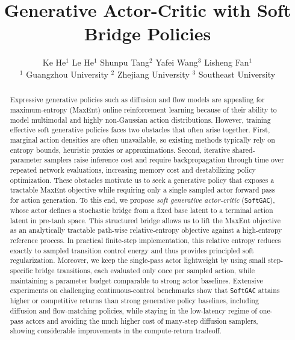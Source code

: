 \documentclass[11pt]{article}
\title{Generative Actor-Critic with Soft Bridge Policies}
\author{%
Ke He$^{1}$%
\quad
Le He$^{1}$%
\quad
Shunpu Tang$^{2}$ 
\quad
Yafei Wang$^{3}$ 
\quad
Lisheng Fan$^{1}$ \\
$^{1}$ Guangzhou University  {}
$^{2}$ Zhejiang University  {}
$^{3}$ Southeast University
}
\date{}
\newcommand{\myalgo}{\texttt{SoftGAC}\xspace}
\begin{document}
\maketitle


\begin{abstract}
Expressive generative policies such as diffusion and flow models are appealing for maximum-entropy (MaxEnt) online reinforcement learning because of their ability to model multimodal and highly non-Gaussian action distributions. However, training effective soft generative policies faces two obstacles that often arise together. First, marginal action densities are often unavailable, so existing methods typically rely on entropy bounds, heuristic proxies or approximations. Second, iterative shared-parameter samplers raise inference cost and require backpropagation through time over repeated network evaluations, increasing memory cost and destabilizing policy optimization. These obstacles motivate us to seek a generative policy that exposes a tractable MaxEnt objective while requiring only a single sampled actor forward pass for action generation. To this end, we propose \emph{soft generative actor-critic} (\myalgo), whose actor defines a stochastic bridge from a fixed base latent to a terminal action latent in pre-tanh space. This structured bridge allows us to lift the MaxEnt objective as an analytically tractable path-wise relative-entropy objective against a high-entropy reference process. In practical finite-step implementation, this relative entropy reduces exactly to sampled transition control energy and thus provides principled soft regularization. Moreover, we keep the single-pass actor lightweight by using small step-specific bridge transitions, each evaluated only once per sampled action, while maintaining a parameter budget comparable to strong actor baselines. Extensive experiments on challenging continuous-control benchmarks show that \myalgo attains higher or competitive returns than strong generative policy baselines, including diffusion and flow-matching policies, while staying in the low-latency regime of one-pass actors and avoiding the much higher cost of many-step diffusion samplers, showing considerable improvements in the compute-return tradeoff.
\end{abstract}
\end{document}
